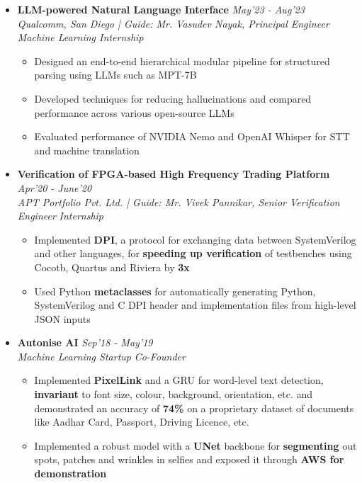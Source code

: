 \documentclass[10pt,letterpaper,sans]{moderncv}
\providecommand{\sl}{\slshape}
\begin{document}
\begin{itemize}
\item \textbf{LLM-powered Natural Language Interface} \hfill{\sl May'23 - Aug'23}\\
\textit{Qualcomm, San Diego | Guide: Mr. Vasudev Nayak, Principal Engineer} \hfill {\sl Machine Learning Internship}\\
\vspace{-12pt}
\begin{itemize}
\item Designed an end-to-end hierarchical modular pipeline for structured parsing using LLMs such as MPT-7B
\item Developed techniques for reducing hallucinations and compared performance across various open-source LLMs
\item Evaluated performance of NVIDIA Nemo and OpenAI Whisper for STT and machine translation
\end{itemize}
\item \textbf{Verification of FPGA-based High Frequency Trading Platform} \hfill{\sl Apr'20 - June'20}\\
\textit{APT Portfolio Pvt. Ltd. | Guide: Mr. Vivek Pannikar, Senior Verification Engineer} \hfill {\sl Internship}\\
\vspace{-10pt}
\begin{itemize}
\item Implemented \textbf{DPI}, a protocol for exchanging data between SystemVerilog and other languages, for \textbf{speeding up verification} of testbenches using Cocotb, Quartus and Riviera by \textbf{3x}
\item Used Python \textbf{metaclasses} for automatically generating Python, SystemVerilog and C DPI header and implementation files from high-level JSON inputs
\end{itemize}
\vspace{5pt}
\item \textbf{Autonise AI} \hfill{\sl Sep'18 - May'19}\\
\textit{Machine Learning Startup} \hfill {\sl Co-Founder}\\
\vspace{-10pt}
\begin{itemize}
\item Implemented \textbf{PixelLink} and a GRU for word-level text detection, \textbf{invariant} to font size, colour, background, orientation, etc. and demonstrated an accuracy of \textbf{74\%} on a proprietary dataset of documents like Aadhar Card, Passport, Driving Licence, etc.
\item Implemented a robust model with a \textbf{UNet} backbone for \textbf{segmenting} out spots, patches and wrinkles in selfies and exposed it through \textbf{AWS for demonstration}
\end{itemize}
\end{itemize}
\end{document}

